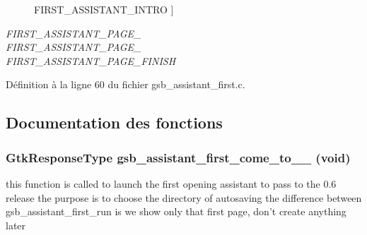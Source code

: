 \begin{Desc}
\begin{description}
{FIRST\_\-ASSISTANT\_\-INTRO\label{gsb__assistant__first_8c_a534a709ba3c1b8b898f949336c2d2ecaa9df2c40e561c1a5b46974460edea492e}
}]\item[{\em 
FIRST\_\-ASSISTANT\_\-PAGE\_\-2\label{gsb__assistant__first_8c_a534a709ba3c1b8b898f949336c2d2ecaa3efe228569181d03e959a1fefced13aa}
}]\item[{\em 
FIRST\_\-ASSISTANT\_\-PAGE\_\-3\label{gsb__assistant__first_8c_a534a709ba3c1b8b898f949336c2d2ecaacb4356954bb745ecbd6f1ba73e40e6d3}
}]\item[{\em 
FIRST\_\-ASSISTANT\_\-PAGE\_\-FINISH\label{gsb__assistant__first_8c_a534a709ba3c1b8b898f949336c2d2ecaa6fd91e61faa9e79f0c0ee14ead65d72f}
}]\end{description}
\end{Desc}



Définition à la ligne 60 du fichier gsb\_\-assistant\_\-first.c.



\subsection{Documentation des fonctions}
\subsubsection[{gsb\_\-assistant\_\-first\_\-come\_\-to\_\-0\_\-6}]{\setlength{\rightskip}{0pt plus 5cm}GtkResponseType gsb\_\-assistant\_\-first\_\-come\_\-to\_\_ (void)}\label{gsb__assistant__first_8c_a8b17583fe61c7e9a9eb87a9d02857dce}
this function is called to launch the first opening assistant to pass to the 0.6 release the purpose is to choose the directory of autosaving the difference between gsb\_\-assistant\_\-first\_\-run is we show only that first page, don't create anything later



